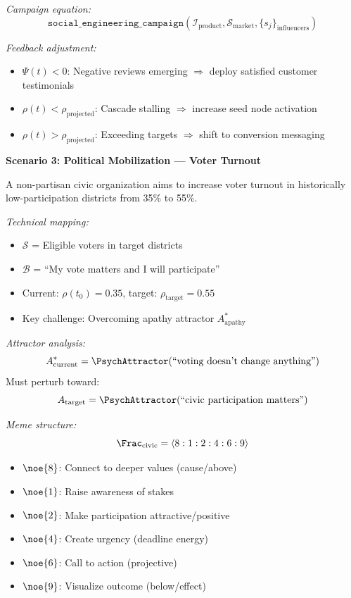 \begin{tcolorbox}[colback=yellow!5!white,colframe=yellow!65!black,title=\textbf{Real-Life Scenarios: Social Engineering Applications},breakable]
\textit{Campaign equation:}
\[
    \mathtt{social\_engineering\_campaign}(\mathcal{I}_{\mathrm{product}}, \mathcal{S}_{\mathrm{market}}, \{s_j\}_{\mathrm{influencers}})
\]

\textit{Feedback adjustment:}
\begin{itemize}
    \item $\Psi(t) < 0$: Negative reviews emerging $\Rightarrow$ deploy satisfied customer testimonials
    \item $\rho(t) < \rho_{\mathrm{projected}}$: Cascade stalling $\Rightarrow$ increase seed node activation
    \item $\rho(t) > \rho_{\mathrm{projected}}$: Exceeding targets $\Rightarrow$ shift to conversion messaging
\end{itemize}

\medskip

\textbf{Scenario 3: Political Mobilization --- Voter Turnout}

A non-partisan civic organization aims to increase voter turnout in historically low-participation districts from 35\% to 55\%.

\textit{Technical mapping:}
\begin{itemize}
    \item $\mathcal{S}$ = Eligible voters in target districts
    \item $\mathcal{B}$ = ``My vote matters and I will participate''
    \item Current: $\rho(t_0) = 0.35$, target: $\rho_{\mathrm{target}} = 0.55$
    \item Key challenge: Overcoming apathy attractor $A_{\mathrm{apathy}}^*$
\end{itemize}

\textit{Attractor analysis:}
\[
    A_{\mathrm{current}}^* = \PsychAttractor(\text{``voting doesn't change anything''})
\]
Must perturb toward:
\[
    A_{\mathrm{target}} = \PsychAttractor(\text{``civic participation matters''})
\]

\textit{Meme structure:}
\[
    \Frac_{\mathrm{civic}} = \langle 8:1:2:4:6:9 \rangle
\]
\begin{itemize}
    \item $\noe{8}$: Connect to deeper values (cause/above)
    \item $\noe{1}$: Raise awareness of stakes
    \item $\noe{2}$: Make participation attractive/positive
    \item $\noe{4}$: Create urgency (deadline energy)
    \item $\noe{6}$: Call to action (projective)
    \item $\noe{9}$: Visualize outcome (below/effect)
\end{itemize}


\end{tcolorbox}
